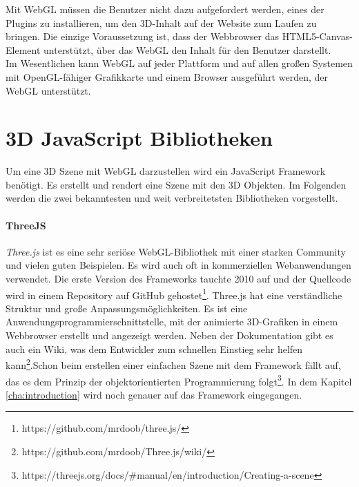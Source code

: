 Mit WebGL müssen die Benutzer nicht dazu aufgefordert werden, eines der Plugins zu installieren, um den 3D-Inhalt auf der Website zum Laufen zu bringen. Die einzige Voraussetzung ist, dass der Webbrowser das HTML5-Canvas-Element unterstützt, über das WebGL den Inhalt für den Benutzer darstellt.\\
Im Wesentlichen kann WebGL auf jeder Plattform und auf allen großen Systemen mit OpenGL-fähiger Grafikkarte und einem Browser ausgeführt werden, der WebGL unterstützt.\\

\section{3D JavaScript Bibliotheken}
\label{sec:javascriptbibliotheken}
%
Um eine 3D Szene mit WebGL darzustellen wird ein JavaScript Framework benötigt. Es erstellt und rendert eine Szene mit den 3D Objekten. Im Folgenden werden die zwei bekanntesten und weit verbreitetsten Bibliotheken vorgestellt.
\paragraph{ThreeJS}
\label{sec:threeJS}
%
\textit{Three.js} ist es eine sehr seriöse WebGL-Bibliothek mit einer starken Community und vielen guten Beispielen. Es wird auch oft in kommerziellen Webanwendungen verwendet. Die erste Version des Frameworks tauchte 2010 auf und der Quellcode wird in einem Repository auf GitHub gehostet\footnote{https://github.com/mrdoob/three.js/}. Three.js hat eine verständliche Struktur und große Anpassungsmöglichkeiten. Es ist eine Anwendungsprogrammierschnittstelle, mit der animierte 3D-Grafiken in einem Webbrowser erstellt und angezeigt werden. Neben der Dokumentation gibt es auch ein Wiki, was dem Entwickler zum schnellen Einstieg sehr helfen kann\footnote{https://github.com/mrdoob/Three.js/wiki/}.Schon beim erstellen einer einfachen Szene mit dem Framework fällt auf, das es dem Prinzip der objektorientierten Programmierung folgt\footnote{https://threejs.org/docs/\#manual/en/introduction/Creating-a-scene}. In dem Kapitel \ref{cha:introduction} wird noch genauer auf das Framework eingegangen.
%
%
%

